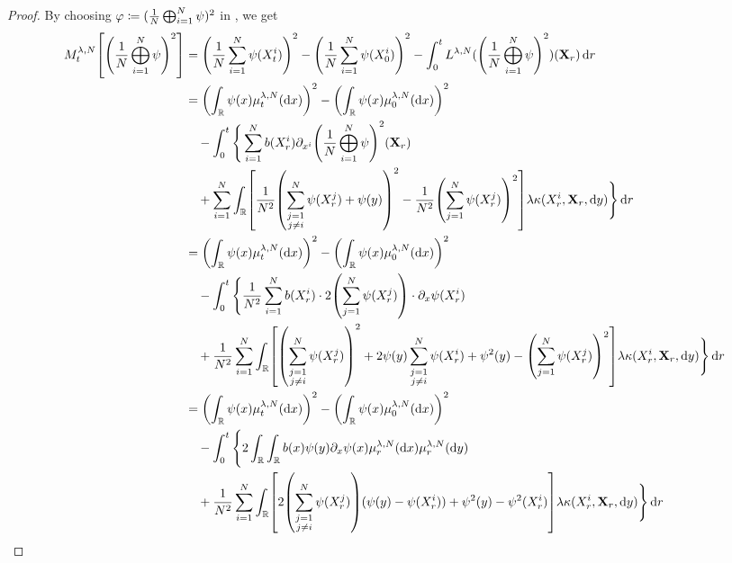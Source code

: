 \documentclass{article}
\begin{document}
\begin{proof}
By choosing $\varphi \coloneqq \lparen \frac{1}{N} \bigoplus_{i=1}^N \psi \rparen^2$ in , we get
\begin{equation}
\begin{split}
    M_t^{\lambda, N}\sbr*{ \br*{ \frac{1}{N} \bigoplus_{i=1}^N \psi }^2 }
    &= \br*{\frac{1}{N} \sum_{i=1}^N \psi(X_t^i)}^2 - \br*{\frac{1}{N} \sum_{i=1}^N \psi(X_0^i)}^2
    - \int_0^t L^{\lambda, N}(\br*{ \frac{1}{N} \bigoplus_{i=1}^N \psi }^2) (\bm{X}_r) \odif{r} \\
    &= \br*{ \int_\potspace \psi(x) \mu_t^{\lambda, N}(\odif{x}) }^2 - \br*{ \int_\potspace \psi(x) \mu_0^{\lambda, N}(\odif{x}) }^2 \\
    &\quad {} - \int_0^t \Bigg\{ \sum_{i=1}^N b(X_r^i) \partial_{x^i}\br*{ \frac{1}{N} \bigoplus_{i=1}^N \psi }^2 (\bm{X}_r) \\
    &\quad {} + \sum_{i=1}^N \int_\potspace \sbr*{  \frac{1}{N^2} \br*{ \sum_{\substack{j=1 \\ j \neq i}}^N \psi(X_r^j) + \psi(y) }^2 - \frac{1}{N^2} \br*{ \sum_{j=1}^N \psi(X_r^j) }^2 } \lambda \kappa(X_r^i,\bm{X}_r,\odif{y}) \Bigg\} \odif{r} \\
    &= \br*{ \int_\potspace \psi(x) \mu_t^{\lambda, N}(\odif{x}) }^2 - \br*{ \int_\potspace \psi(x) \mu_0^{\lambda, N}(\odif{x}) }^2 \\
    &\quad {} - \int_0^t \Bigg\{ \frac{1}{N^2} \sum_{i=1}^N b(X_r^i) \cdot 2 \br*{ \sum_{j=1}^N \psi(X_r^j) } \cdot \partial_x \psi(X_r^i) \\
    &\quad + \frac{1}{N^2} \sum_{i=1}^N \int_\potspace \sbr*{ \br*{ \sum_{\substack{j=1 \\ j \neq i}}^N \psi(X_r^j) }^2 + 2 \psi(y) \sum_{\substack{j=1 \\ j \neq i}}^N \psi(X_r^i) + \psi^2(y) - \br*{ \sum_{j=1}^N \psi(X_r^j) }^2 } \lambda \kappa(X_r^i,\bm{X}_r,\odif{y}) \Bigg\} \odif{r} \\
    &= \br*{ \int_\potspace \psi(x) \mu_t^{\lambda, N}(\odif{x}) }^2 - \br*{ \int_\potspace \psi(x) \mu_0^{\lambda, N}(\odif{x}) }^2 \\
    &\quad {} - \int_0^t \Bigg\{ 2 \int_\potspace \int_\potspace b(x) \psi(y) \partial_x \psi (x) \mu_r^{\lambda,N}(\odif{x}) \mu_r^{\lambda,N}(\odif{y}) \\
    &\quad + \frac{1}{N^2} \sum_{i=1}^N \int_\potspace \sbr*{ 2 \br*{\sum_{\substack{j=1 \\ j \neq i}}^N \psi(X_r^j)} (\psi(y) - \psi(X_r^i)) + \psi^2(y) - \psi^2(X_r^i) } \lambda \kappa(X_r^i,\bm{X}_r,\odif{y}) \Bigg\} \odif{r} \\

\end{split}
\end{equation}
\end{proof}
\end{document}
